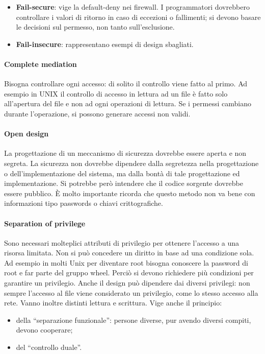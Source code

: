 \begin{itemize}
    \item \textbf{Fail-secure}: vige la default-deny nei firewall.
          I programmatori dovrebbero controllare i valori
          di ritorno in caso di eccezioni o fallimenti; si devono basare le
          decisioni sul permesso, non
          tanto sull'esclusione.
    \item \textbf{Fail-insecure}: rappresentano esempi di design sbagliati.
\end{itemize}

\paragraph{Complete mediation}
Bisogna controllare ogni accesso: di solito il controllo viene fatto al primo.
Ad esempio in UNIX il
controllo di accesso in lettura ad un file è fatto solo all'apertura del file e
non ad ogni operazioni di lettura.
Se i permessi cambiano durante l'operazione, si possono generare accessi non
validi.

\paragraph{Open design}
La progettazione di un meccanismo di sicurezza dovrebbe essere aperta e
non segreta.
La sicurezza non dovrebbe dipendere dalla segretezza nella progettazione o
dell'implementazione del sistema, ma dalla bontà di tale progettazione ed
implementazione. Si potrebbe però intendere
che il codice sorgente dovrebbe essere pubblico.
È molto importante ricorda che questo metodo non va bene con informazioni
tipo passwords o chiavi crittografiche.

\paragraph{Separation of privilege}
Sono necessari molteplici attributi di privilegio per ottenere
l'accesso a una risorsa limitata.
Non si può concedere un diritto in base ad una condizione sola.
Ad esempio in molti Unix per
diventare root bisogna conoscere la password di root e far parte del gruppo wheel.
Perciò si devono richiedere più condizioni per garantire un privilegio.
Anche il design può dipendere dai diversi privilegi: non sempre l'accesso al
file viene considerato
un privilegio, come lo stesso accesso alla rete.
Vanno inoltre distinti lettura e scrittura.
Vige anche il principio:

\begin{itemize}
    \item della ``separazione funzionale'': persone diverse, pur avendo diversi
          compiti, devono cooperare;
    \item del ``controllo duale''.
\end{itemize}


